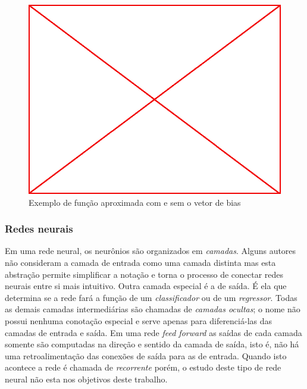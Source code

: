 \begin{figure}
  \caption{Exemplo de função aproximada com e sem o vetor de bias}
  \begin{center}
    \includegraphics[scale=0.5]{placeholder}
  \end{center}
\end{figure}

\subsubsection{Redes neurais}

Em uma rede neural, os neurônios são organizados em \emph{camadas}. Alguns
autores não consideram a camada de entrada como uma camada distinta mas esta
abstração permite simplificar a notação e torna o processo de conectar redes
neurais entre si mais intuitivo. Outra camada especial é a de saída. É ela que
determina se a rede fará a função de um \emph{classificador} ou de um
\emph{regressor}. Todas as demais camadas intermediárias são chamadas de
\emph{camadas ocultas}; o nome não possui nenhuma conotação especial e serve
apenas para diferenciá-las das camadas de entrada e saída. Em uma rede
\emph{feed forward} as saídas de cada camada somente são computadas na direção
e sentido da camada de saída, isto é, não há uma retroalimentação das conexões
de saída para as de entrada. Quando isto acontece a rede é chamada de
\emph{recorrente} porém, o estudo deste tipo de rede neural não esta nos
objetivos deste trabalho.

